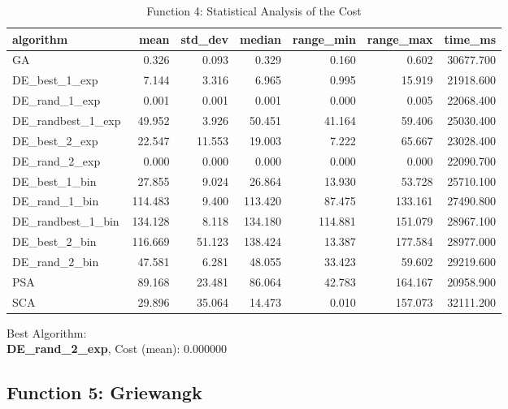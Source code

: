 \documentclass[12pt]{article}
\begin{document}
\begin{table}[H]
    \centering
    \footnotesize
\begin{tabular}{lrrrrrr}
\toprule
         algorithm &    mean &  std\_dev &  median &  range\_min &  range\_max &   time\_ms \\
\midrule
                GA &   0.326 &    0.093 &   0.329 &      0.160 &      0.602 & 30677.700 \\
     DE\_best\_1\_exp &   7.144 &    3.316 &   6.965 &      0.995 &     15.919 & 21918.600 \\
     DE\_rand\_1\_exp &   0.001 &    0.001 &   0.001 &      0.000 &      0.005 & 22068.400 \\
 DE\_randbest\_1\_exp &  49.952 &    3.926 &  50.451 &     41.164 &     59.406 & 25030.400 \\
     DE\_best\_2\_exp &  22.547 &   11.553 &  19.003 &      7.222 &     65.667 & 23028.400 \\
     DE\_rand\_2\_exp &   0.000 &    0.000 &   0.000 &      0.000 &      0.000 & 22090.700 \\
     DE\_best\_1\_bin &  27.855 &    9.024 &  26.864 &     13.930 &     53.728 & 25710.100 \\
     DE\_rand\_1\_bin & 114.483 &    9.400 & 113.420 &     87.475 &    133.161 & 27490.800 \\
 DE\_randbest\_1\_bin & 134.128 &    8.118 & 134.180 &    114.881 &    151.079 & 28967.100 \\
     DE\_best\_2\_bin & 116.669 &   51.123 & 138.424 &     13.387 &    177.584 & 28977.000 \\
     DE\_rand\_2\_bin &  47.581 &    6.281 &  48.055 &     33.423 &     59.602 & 29219.600 \\
               PSA &  89.168 &   23.481 &  86.064 &     42.783 &    164.167 & 20958.900 \\
               SCA &  29.896 &   35.064 &  14.473 &      0.010 &    157.073 & 32111.200 \\
\bottomrule
\end{tabular}

\caption{Function 4: Statistical Analysis of the Cost} 
    \end{table}
Best Algorithm: \\
\textbf{DE\_rand\_2\_exp}, Cost (mean): 0.000000\\
\newpage
\subsection{Function 5: Griewangk}
\end{document}

